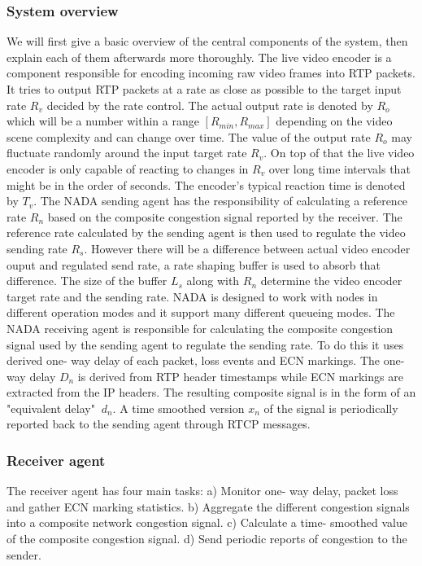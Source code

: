 \documentclass[UKenglish]{ifimaster}
\begin{document}
\subsubsection{System overview}
We will first give a basic overview of the central components of the system, then explain each of them afterwards more thoroughly.
The live video encoder is a component responsible for encoding incoming raw video frames into RTP packets.
It tries to output RTP packets at a rate as close as possible to the target input rate $R_v$ decided by the rate control. 
The actual output rate is denoted by $R_o$ which will be a number within a range $[R_{min},R_{max}]$ depending on the video scene complexity and can change over time.
The value of the output rate $R_o$ may fluctuate randomly around the input target rate $R_v$.
On top of that the live video encoder is only capable of reacting to changes in $R_v$ over long time intervals that might be in the order of seconds.
The encoder's typical reaction time is denoted by $T_v$.
The NADA sending agent has the responsibility of calculating a reference rate $R_n$ based on the composite congestion signal reported by the receiver. 
The reference rate calculated by the sending agent is then used to regulate the video sending rate $R_s$.
However there will be a difference between actual video encoder ouput and regulated send rate, a rate shaping buffer is used to absorb that difference.
The size of the buffer $L_s$ along with $R_n$ determine the video encoder target rate and the sending rate. 
NADA is designed to work with nodes in different operation modes and it support many different queueing modes.
The NADA receiving agent is responsible for calculating the composite congestion signal used by the sending agent to regulate the sending rate. 
To do this it uses derived one- way delay of each packet, loss events and ECN markings.
The one- way delay $D_n$ is derived from RTP header timestamps while ECN markings are extracted from the IP headers. 
The resulting composite signal is in the form of an "equivalent delay" $~d_n$.
A time smoothed version $x_n$ of the signal is periodically reported back to the sending agent through RTCP messages.

\subsubsection{Receiver agent}
The receiver agent has four main tasks: 
a) Monitor one- way delay, packet loss and gather ECN marking statistics. 
b) Aggregate the different congestion signals into a composite network congestion signal. 
c) Calculate a time- smoothed value of the composite congestion signal. 
d) Send periodic reports of congestion to the sender.
\end{document}
